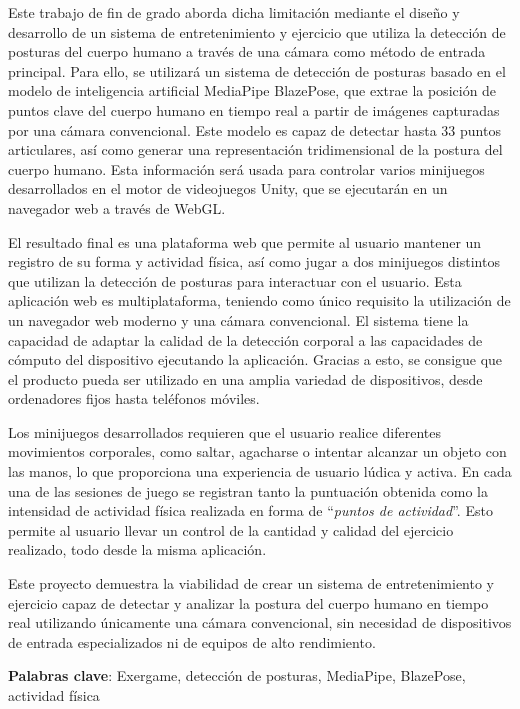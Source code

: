 Este trabajo de fin de grado aborda dicha limitación mediante el diseño y desarrollo de un sistema de
entretenimiento y ejercicio que utiliza la detección de posturas del cuerpo humano a través de una cámara
como método de entrada principal.
Para ello, se utilizará un sistema de detección de posturas basado en el modelo de inteligencia artificial
MediaPipe BlazePose, que extrae la posición de puntos clave del cuerpo humano en tiempo real a partir de
imágenes capturadas por una cámara convencional. Este modelo es capaz de detectar hasta 33 puntos
articulares, así como generar una representación tridimensional de la postura del cuerpo humano.
Esta información será usada para controlar varios minijuegos desarrollados en el motor de videojuegos
Unity, que se ejecutarán en un navegador web a través de WebGL.

El resultado final es una plataforma web que permite al usuario mantener un registro de su forma y
actividad física, así como jugar a dos minijuegos distintos que utilizan la detección de posturas
para interactuar con el usuario. Esta aplicación web es multiplataforma, teniendo como único requisito
la utilización de un navegador web moderno y una cámara convencional. El sistema tiene la capacidad
de adaptar la calidad de la detección corporal a las capacidades de cómputo del dispositivo ejecutando
la aplicación. Gracias a esto, se consigue que el producto pueda ser utilizado en una amplia variedad
de dispositivos, desde ordenadores fijos hasta teléfonos móviles.

Los minijuegos desarrollados requieren que el usuario realice diferentes movimientos corporales,
como saltar, agacharse o intentar alcanzar un objeto con las manos, lo que proporciona una
experiencia de usuario lúdica y activa. En cada una de las sesiones de juego se registran tanto
la puntuación obtenida como la intensidad de actividad física realizada en forma de \enquote{\textit{puntos
de actividad}}. Esto permite al usuario llevar un control de la cantidad y calidad del ejercicio
realizado, todo desde la misma aplicación.

Este proyecto demuestra la viabilidad de crear un sistema de entretenimiento y ejercicio capaz de
detectar y analizar la postura del cuerpo humano en tiempo real utilizando únicamente una cámara
convencional, sin necesidad de dispositivos de entrada especializados ni de equipos de alto rendimiento.

\vspace{5mm}
\textbf{Palabras clave}: Exergame, detección de posturas, MediaPipe, BlazePose, actividad física

